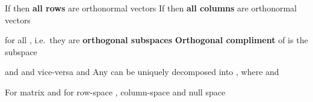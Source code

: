 \begin{itemize}
            \begin{itemize}

                  \vItem
                        If  then \textbf{all  rows} are orthonormal
                        vectors
                  \vItem
                        If  then \textbf{all  columns} are orthonormal
                        vectors
            \end{itemize}
      \vItem
            for all , i.e.~they are
            \textbf{orthogonal subspaces}
      \vItem
            \textbf{Orthogonal compliment} of  is
            the subspace

            \begin{itemize}

                  \vItem
                         and
                  \vItem
                         and vice-versa
                  \vItem
                         and
                  \vItem
                        Any  can be uniquely decomposed
                        into , where
                         and
            \end{itemize}
      \vItem
            For matrix  and for row-space
            , column-space  and null
            space 

            \begin{itemize}


\end{itemize}
\end{itemize}
